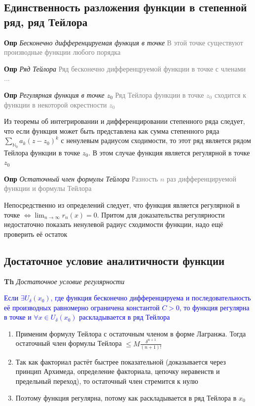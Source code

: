 \subsection{Единственность разложения функции в степенной ряд, ряд Тейлора}

\textbf{Опр} \textit{Бесконечно дифференцируемая функция в точке} \textcolor{gray}{В этой точке существуют
производные функции любого порядка}

\textbf{Опр} \textit{Ряд Тейлора} \textcolor{gray}{Ряд бесконечно дифференцруемой функции в точке с членами ...}

\textbf{Опр} \textit{Регулярная функция в точке $z_0$} \textcolor{gray}{Ряд Тейлора функции в точке $z_0$
    сходится к функции в некоторой окрестности $z_0$}

Из теоремы об интегрировании и дифференцировании степенного ряда следует, что если функция может быть
представлена как сумма степенного ряда $\sum_{\mathbb{N}_0} a_k (z - z_0)^k$ с ненулевым радиусом сходимости, то
этот ряд является рядом Тейлора функции в точке $z_0$.
В этом случае функция является регулярной в точке $z_0$

\textbf{Опр} \textit{Остаточный член формулы Тейлора} \textcolor{gray}{Разность $n$ раз дифференцируемой функции
и формулы Тейлора}

Непосредственно из определений следует, что функция является регулярной в точке
$\Leftrightarrow \lim_{n\to\infty} r_n(x) = 0$.
Притом для доказательства регулярности недостаточно показать ненулевой радиус сходимости функции, надо ещё проверить
её остаток

\subsection{Достаточное условие аналитичности функции}

\textbf{Th} \textit{Достаточное условие регулярности}

\textcolor{blue}{Если $\exists U_\delta (x_0)$, где функция бесконечно дифференцируема и последовательность её
производных равномерно ограничена константой $C > 0$, то функция регулярна в точке и $\forall x \in U_\delta (x_0)$
    раскладывается в ряд Тейлора}

\begin{enumerate}
    \item Применим формулу Тейлора с остаточным членом в форме Лагранжа.
    Тогда остаточный член формулы Тейлора $\leq M \frac{\delta^{n+1}}{(n+1)!}$
    \item Так как факториал растёт быстрее показательной (доказывается через принцип Архимеда, определение
    факториала, цепочку неравенств и предельный переход), то остаточный член стремится к нулю
    \item Поэтому функция регулярна, потому как раскладывается в ряд Тейлора в $x_0$
\end{enumerate}

